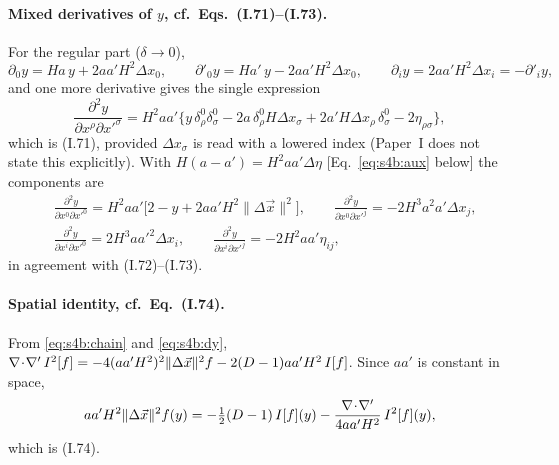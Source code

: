 \documentclass[aps,prd,onecolumn,10pt,nofootinbib,floatfix]{revtex4-2}
\newcommand{\PI}{Paper~I}
\newcommand{\eqI}[1]{(I.#1)}
\begin{document}
\paragraph*{Mixed derivatives of $y$, cf.\ Eqs.~(I.71)--(I.73).}
For the regular part ($\delta\to0$),
\begin{equation}
\partial_0y=Ha\,y+2aa'H^2\Delta x_0,\qquad
\partial'_0y=Ha'\,y-2aa'H^2\Delta x_0,\qquad
\partial_iy=2aa'H^2\Delta x_i=-\partial'_iy ,
\label{eq:s4b:dy}
\end{equation}
and one more derivative gives the single expression
\begin{equation}
\frac{\partial^2y}{\partial x^\rho\partial x'^\sigma}
=H^2aa'\big\{y\,\delta^0_\rho\delta^0_\sigma-2a\,\delta^0_\rho H\Delta x_\sigma+2a'H\Delta x_\rho\,\delta^0_\sigma
-2\eta_{\rho\sigma}\big\},
\label{eq:s4b:I71}
\end{equation}
which is \eqI{71}, provided $\Delta x_\sigma$ is read with a lowered index (\PI{} does not state this explicitly). With
$H(a-a')=H^2aa'\Delta\eta$ [Eq.~\eqref{eq:s4b:aux} below] the components are
\begin{equation}
\begin{aligned}
&\frac{\partial^2y}{\partial x^0\partial x'^0}=H^2aa'\big[2-y+2aa'H^2\|\Delta\vec x\|^2\big],\qquad
\frac{\partial^2y}{\partial x^0\partial x'^j}=-2H^3a^2a'\Delta x_j,\\
&\frac{\partial^2y}{\partial x^i\partial x'^0}=2H^3aa'^2\Delta x_i,\qquad
\frac{\partial^2y}{\partial x^i\partial x'^j}=-2H^2aa'\eta_{ij},
\end{aligned}
\label{eq:s4b:I72}
\end{equation}
in agreement with \eqI{72}--\eqI{73}.

\paragraph*{Spatial identity, cf.\ Eq.~(I.74).}
From \eqref{eq:s4b:chain} and \eqref{eq:s4b:dy},
$\nabla\!\cdot\!\nabla'\,I^2[f]=-4(aa'H^2)^2\|\Delta\vec x\|^2f-2(D-1)aa'H^2\,I[f]$. Since $aa'$ is constant in space,
\begin{equation}
aa'H^2\|\Delta\vec x\|^2f(y)=-\tfrac12(D-1)\,I[f](y)-\frac{\nabla\!\cdot\!\nabla'}{4aa'H^2}\,I^2[f](y),
\label{eq:s4b:I74}
\end{equation}
which is \eqI{74}.
\end{document}
